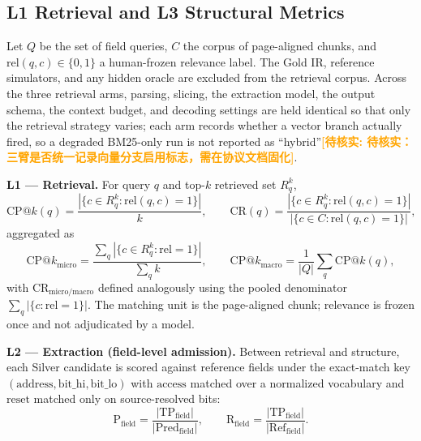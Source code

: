 \documentclass[preprint,review]{elsarticle}
\theoremstyle{definition}
\newcommand{\unverified}[1]{\textcolor{orange}{\textbf{[待核实: #1]}}}
\begin{document}
\subsection{L1 Retrieval and L3 Structural Metrics}
\label{sec:metrics}

Let $Q$ be the set of field queries, $C$ the corpus of page-aligned chunks, and
$\mathrm{rel}(q,c)\in\{0,1\}$ a human-frozen relevance label. The Gold IR, reference
simulators, and any hidden oracle are excluded from the retrieval corpus. Across the three
retrieval arms, parsing, slicing, the extraction model, the output schema, the context
budget, and decoding settings are held identical so that only the retrieval strategy varies;
each arm records whether a vector branch actually fired, so a degraded BM25-only run is not
reported as ``hybrid''\unverified{待核实：三臂是否统一记录向量分支启用标志，需在协议文档固化}.

\textbf{L1 --- Retrieval.} For query $q$ and top-$k$ retrieved set $R_q^{k}$,
\begin{equation}
\mathrm{CP@}k(q)=\frac{|\{c\in R_q^{k}:\mathrm{rel}(q,c)=1\}|}{k},\qquad
\mathrm{CR}(q)=\frac{|\{c\in R_q^{k}:\mathrm{rel}(q,c)=1\}|}{|\{c\in C:\mathrm{rel}(q,c)=1\}|},
\label{eq:l1}
\end{equation}
aggregated as
\begin{equation}
\mathrm{CP@}k_{\mathrm{micro}}=
\frac{\sum_{q}|\{c\in R_q^{k}:\mathrm{rel}=1\}|}{\sum_{q}k},\qquad
\mathrm{CP@}k_{\mathrm{macro}}=\frac{1}{|Q|}\sum_{q}\mathrm{CP@}k(q),
\label{eq:l1-agg}
\end{equation}
with $\mathrm{CR}_{\mathrm{micro/macro}}$ defined analogously using the pooled denominator
$\sum_q|\{c:\mathrm{rel}=1\}|$. The matching unit is the page-aligned chunk; relevance is
frozen once and not adjudicated by a model.

\textbf{L2 --- Extraction (field-level admission).} Between retrieval and structure, each
Silver candidate is scored against reference fields under the exact-match key
$(\mathrm{address},\mathrm{bit\_hi},\mathrm{bit\_lo})$ with $\mathrm{access}$ matched over a
normalized vocabulary and $\mathrm{reset}$ matched only on source-resolved bits:
\begin{equation}
\mathrm{P}_{\mathrm{field}}=\frac{|\mathrm{TP}_{\mathrm{field}}|}{|\mathrm{Pred}_{\mathrm{field}}|},\qquad
\mathrm{R}_{\mathrm{field}}=\frac{|\mathrm{TP}_{\mathrm{field}}|}{|\mathrm{Ref}_{\mathrm{field}}|}.
\label{eq:l2}
\end{equation}
\end{document}
